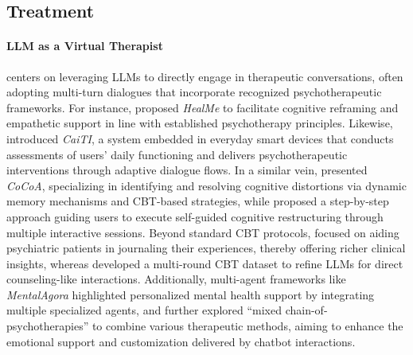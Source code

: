 \subsection{Treatment}

\paragraph{LLM as a Virtual Therapist} centers on leveraging LLMs to directly engage in therapeutic conversations, often adopting multi-turn dialogues that incorporate recognized psychotherapeutic frameworks. For instance, \citet{20} proposed \emph{HealMe} to facilitate cognitive reframing and empathetic support in line with established psychotherapy principles. Likewise, \citet{29} introduced \emph{CaiTI}, a system embedded in everyday smart devices that conducts assessments of users’ daily functioning and delivers psychotherapeutic interventions through adaptive dialogue flows. In a similar vein, \citet{40} presented \emph{CoCoA}, specializing in identifying and resolving cognitive distortions via dynamic memory mechanisms and CBT-based strategies, while \citet{54} proposed a step-by-step approach guiding users to execute self-guided cognitive restructuring through multiple interactive sessions. Beyond standard CBT protocols, \citet{55} focused on aiding psychiatric patients in journaling their experiences, thereby offering richer clinical insights, whereas \citet{77} developed a multi-round CBT dataset to refine LLMs for direct counseling-like interactions. Additionally, multi-agent frameworks like \emph{MentalAgora} \citep{78} highlighted personalized mental health support by integrating multiple specialized agents, and \citet{109} further explored “mixed chain-of-psychotherapies” to combine various therapeutic methods, aiming to enhance the emotional support and customization delivered by chatbot interactions.

